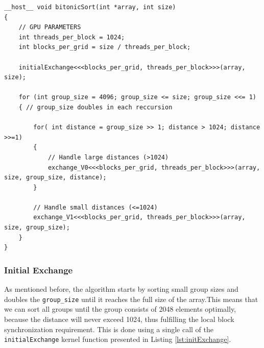 \documentclass[a4paper,12pt]{article}
\begin{document}
\begin{lstlisting}[caption={Bitonic Sort algorithm of V1}, label={lst:bitSort1}]
    __host__ void bitonicSort(int *array, int size)
{
    // GPU PARAMETERS
    int threads_per_block = 1024;
    int blocks_per_grid = size / threads_per_block;

    initialExchange<<<blocks_per_grid, threads_per_block>>>(array, size);

    for (int group_size = 4096; group_size <= size; group_size <<= 1)
    { // group_size doubles in each reccursion

        for( int distance = group_size >> 1; distance > 1024; distance >>=1)
        {
            // Handle large distances (>1024)
            exchange_V0<<<blocks_per_grid, threads_per_block>>>(array, size, group_size, distance);
        }

        // Handle small distances (<=1024)
        exchange_V1<<<blocks_per_grid, threads_per_block>>>(array, size, group_size);
    }
}
\end{lstlisting}

\subsubsection*{Initial Exchange}
As mentioned before, the algorithm starts by sorting small group sizes and doubles the \texttt{group\_size} until it reaches the full size of the array.This means that we can sort all groups until the group consists of 2048 elements optimally, because the distance will never exceed 1024, thus fulfilling the local block synchronization requirement. This is done using a single call of the \texttt{initialExchange} kernel function presented in Listing \ref{lst:initExchange}. 
\end{document}
